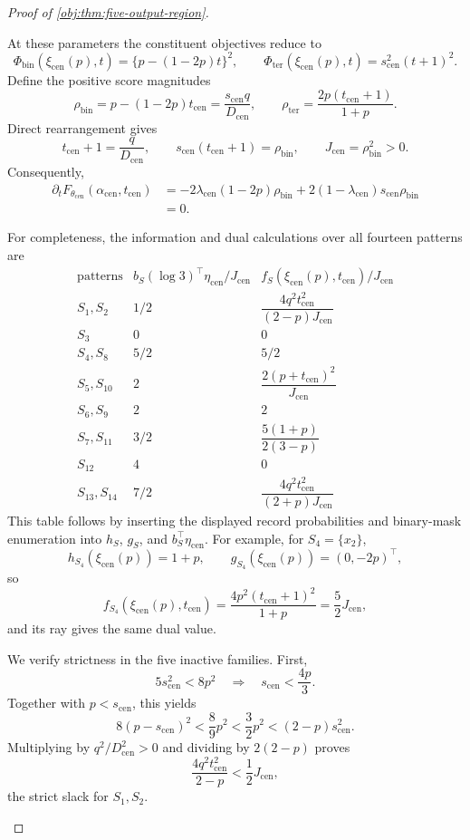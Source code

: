 \begin{proof}[Proof of \cref{obj:thm:five-output-region}]
\begin{enumerate}
At these parameters the constituent objectives reduce to
\[
\Phi_{\mathrm{bin}}(\xi_{\mathrm{cen}}(p),t)
=\{p-(1-2p)t\}^2,
\qquad
\Phi_{\mathrm{ter}}(\xi_{\mathrm{cen}}(p),t)
=s_{\mathrm{cen}}^2(t+1)^2.
\]
Define the positive score magnitudes
\[
\rho_{\mathrm{bin}}
=p-(1-2p)t_{\mathrm{cen}}
=\frac{s_{\mathrm{cen}}q}{D_{\mathrm{cen}}},
\qquad
\rho_{\mathrm{ter}}
=\frac{2p(t_{\mathrm{cen}}+1)}{1+p}.
\]
Direct rearrangement gives
\[
t_{\mathrm{cen}}+1=\frac{q}{D_{\mathrm{cen}}},
\qquad
s_{\mathrm{cen}}(t_{\mathrm{cen}}+1)=\rho_{\mathrm{bin}},
\qquad
J_{\mathrm{cen}}=\rho_{\mathrm{bin}}^2>0.
\]
Consequently,
\[
\begin{aligned}
\partial_tF_{\theta_{\mathrm{cen}}}
(\alpha_{\mathrm{cen}},t_{\mathrm{cen}})
&=-2\lambda_{\mathrm{cen}}(1-2p)\rho_{\mathrm{bin}}
  +2(1-\lambda_{\mathrm{cen}})s_{\mathrm{cen}}\rho_{\mathrm{bin}}\\
&=0.
\end{aligned}
\]

For completeness, the information and dual calculations over all
fourteen patterns are
\[
\begin{array}{c|c|c}
\text{patterns}
&b_S(\log3)^\top\eta_{\mathrm{cen}}/J_{\mathrm{cen}}
&f_S(\xi_{\mathrm{cen}}(p),t_{\mathrm{cen}})/J_{\mathrm{cen}}\\ \hline
S_1,S_2&1/2&
\dfrac{4q^2t_{\mathrm{cen}}^2}{(2-p)J_{\mathrm{cen}}}\\
S_3&0&0\\
S_4,S_8&5/2&5/2\\
S_5,S_{10}&2&
\dfrac{2(p+t_{\mathrm{cen}})^2}{J_{\mathrm{cen}}}\\
S_6,S_9&2&2\\
S_7,S_{11}&3/2&
\dfrac{5(1+p)}{2(3-p)}\\
S_{12}&4&0\\
S_{13},S_{14}&7/2&
\dfrac{4q^2t_{\mathrm{cen}}^2}{(2+p)J_{\mathrm{cen}}}
\end{array}
\]
This table follows by inserting the displayed record probabilities and
binary-mask enumeration into \(h_S\), \(g_S\), and \(b_S^\top\eta_{\mathrm{cen}}\).
For example, for \(S_4=\{x_2\}\),
\[
h_{S_4}(\xi_{\mathrm{cen}}(p))=1+p,\qquad
g_{S_4}(\xi_{\mathrm{cen}}(p))=(0,-2p)^\top,
\]
so
\[
f_{S_4}(\xi_{\mathrm{cen}}(p),t_{\mathrm{cen}})
=
\frac{4p^2(t_{\mathrm{cen}}+1)^2}{1+p}
=\frac52J_{\mathrm{cen}},
\]
and its ray gives the same dual value.

We verify strictness in the five inactive families. First,
\[
5s_{\mathrm{cen}}^2<8p^2
\quad\Longrightarrow\quad
s_{\mathrm{cen}}<\frac{4p}{3}.
\]
Together with \(p<s_{\mathrm{cen}}\), this yields
\[
8(p-s_{\mathrm{cen}})^2
<
\frac89p^2
<
\frac32p^2
<
(2-p)s_{\mathrm{cen}}^2.
\]
Multiplying by \(q^2/D_{\mathrm{cen}}^2>0\) and dividing by \(2(2-p)\)
proves
\[
\frac{4q^2t_{\mathrm{cen}}^2}{2-p}<\frac12J_{\mathrm{cen}},
\]
the strict slack for \(S_1,S_2\).


\end{enumerate}
\end{proof}
